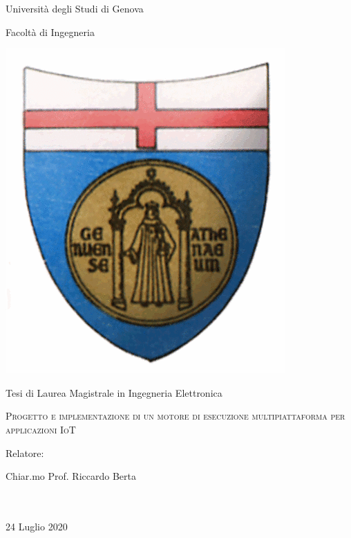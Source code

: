 \documentclass[12pt,oneside]{book}
\begin{document}
\begin{titlepage}
\thispagestyle{empty}
\centering
\begin{center}
	{\Huge Università degli Studi di Genova}	
\end{center}
\begin{center}
	{\LARGE Facoltà di Ingegneria}
\end{center}
\vspace{30pt}
\begin{center}
	\includegraphics[scale=0.35]{pics/logo_unige.png}
\end{center}
\vspace{30pt}
\begin{center}
	{\LARGE Tesi di Laurea Magistrale in Ingegneria Elettronica}
\end{center}
\vspace{30pt}
\begin{center} 
		\Huge \textsc{ Progetto e implementazione di un motore di esecuzione multipiattaforma per applicazioni IoT}
\end{center}
\vspace{50pt}
\raggedright{\Large Relatore:}
\hfill
{}\\
\vspace{10pt}
\raggedright{\Large Chiar.mo Prof. Riccardo Berta}
\hfill
{}\\
\vspace{10pt}
\\
\mbox{ }
\vspace{\fill}
\begin{center}
	{\large 24 Luglio 2020}
\end{center}
\end{titlepage}
\end{document}

